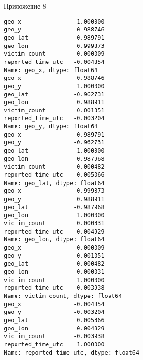 \newpage
{}
Приложение 8
\begin{codeappendix}
\begin{verbatim}
geo_x                1.000000
geo_y                0.988746
geo_lat             -0.989791
geo_lon              0.999873
victim_count         0.000309
reported_time_utc   -0.004854
Name: geo_x, dtype: float64 
geo_x                0.988746
geo_y                1.000000
geo_lat             -0.962731
geo_lon              0.988911
victim_count         0.001351
reported_time_utc   -0.003204
Name: geo_y, dtype: float64 
geo_x               -0.989791
geo_y               -0.962731
geo_lat              1.000000
geo_lon             -0.987968
victim_count         0.000482
reported_time_utc    0.005366
Name: geo_lat, dtype: float64 
geo_x                0.999873
geo_y                0.988911
geo_lat             -0.987968
geo_lon              1.000000
victim_count         0.000331
reported_time_utc   -0.004929
Name: geo_lon, dtype: float64 
geo_x                0.000309
geo_y                0.001351
geo_lat              0.000482
geo_lon              0.000331
victim_count         1.000000
reported_time_utc   -0.003938
Name: victim_count, dtype: float64 
geo_x               -0.004854
geo_y               -0.003204
geo_lat              0.005366
geo_lon             -0.004929
victim_count        -0.003938
reported_time_utc    1.000000
Name: reported_time_utc, dtype: float64 
\end{verbatim}
\end{codeappendix}
\label{appendix:8}

